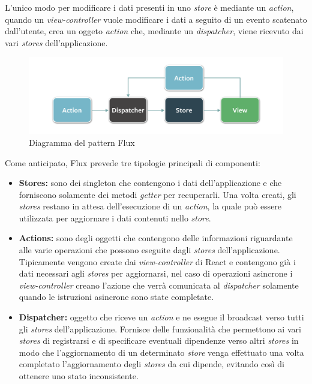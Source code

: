 L'unico modo per modificare i dati presenti in uno \textit{store} è mediante un \textit{action}, quando un \textit{view-controller} vuole modificare i dati a seguito di un evento scatenato dall'utente, crea un oggeto \textit{action} che, mediante un \textit{dispatcher}, viene ricevuto dai vari \textit{stores} dell'applicazione.

\begin{figure}[htp]
\centering
\includegraphics[width=\textwidth*3/4]{../immagini/flux-simple}
\caption{Diagramma del pattern Flux}  
\end{figure}
\FloatBarrier

Come anticipato, Flux prevede tre tipologie principali di componenti:
\begin{itemize}
\item \textbf{Stores:} sono dei \gls{singleton} che contengono i dati dell'applicazione e che forniscono solamente dei metodi \textit{getter} per recuperarli. Una volta creati, gli \textit{stores} restano in attesa dell'esecuzione di un \textit{action}, la quale può essere utilizzata per aggiornare i dati contenuti nello \textit{store}.
\item \textbf{Actions:} sono degli oggetti che contengono delle informazioni riguardante alle varie operazioni che possono eseguite dagli \textit{stores} dell'applicazione. Tipicamente vengono create dai \textit{view-controller} di React e contengono già i dati necessari agli \textit{stores} per aggiornarsi, nel caso di operazioni asincrone i \textit{view-controller} creano l'azione che verrà comunicata al \textit{dispatcher} solamente quando le istruzioni asincrone sono state completate.
\item \textbf{Dispatcher:} oggetto che riceve un \textit{action} e ne esegue il broadcast verso tutti gli \textit{stores} dell'applicazione. Fornisce delle funzionalità che permettono ai vari \textit{stores} di registrarsi e di specificare eventuali dipendenze verso altri \textit{stores} in modo che l'aggiornamento di un determinato \textit{store} venga effettuato una volta completato l'aggiornamento degli \textit{stores} da cui dipende, evitando così di ottenere uno stato inconsistente.
\end{itemize}


